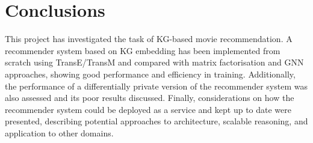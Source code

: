 \section{Conclusions}\label{sec:conclusions}

This project has investigated the task of KG-based movie recommendation.
A recommender system based on KG embedding has been implemented from scratch using TransE/TransM and compared with matrix factorisation and GNN approaches, showing good performance and efficiency in training.
Additionally, the performance of a differentially private version of the recommender system was also assessed and its poor results discussed.
Finally, considerations on how the recommender system could be deployed as a service and kept up to date were presented, describing potential approaches to architecture, scalable reasoning, and application to other domains.


\printbibliography


